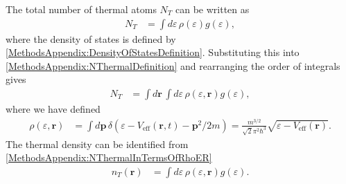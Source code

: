 The total number of thermal atoms $N_T$ can be written as
\begin{align}
    N_T &= \int d\varepsilon\, \rho(\varepsilon) g(\varepsilon),
    \label{MethodsAppendix:NThermalDefinition}
\end{align}
where the density of states is defined by \eqref{MethodsAppendix:DensityOfStatesDefinition}.  Substituting this into \eqref{MethodsAppendix:NThermalDefinition} and rearranging the order of integrals gives
\begin{align}
    N_T &= \int d \bm{r}\, \int d\varepsilon\, \rho(\varepsilon, \bm{r}) g(\varepsilon),
    \label{MethodsAppendix:NThermalInTermsOfRhoER}
\end{align}
where we have defined
\begin{align}
    \rho(\varepsilon, \bm{r}) &= \int d \bm{p}\, \delta\left(\varepsilon - V_\text{eff}(\bm{r}, t) - \bm{p}^2/2m\right) = \frac{m^{3/2}}{\sqrt{2} \pi^2 \hbar^3} \sqrt{\varepsilon - V_\text{eff}(\bm{r})}.
\end{align}
The thermal density can be identified from \eqref{MethodsAppendix:NThermalInTermsOfRhoER}
\begin{align}
    n_T(\bm{r}) &= \int d\varepsilon\, \rho(\varepsilon, \bm{r}) g(\varepsilon).
    \label{MethodsAppendix:nThermalInTermsOfRhoER}
\end{align}

